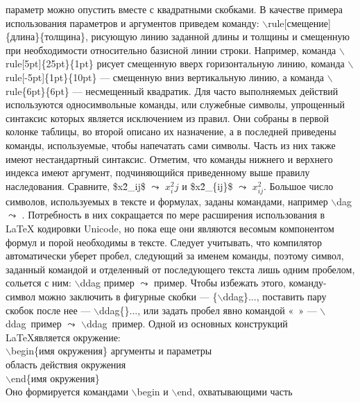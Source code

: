 \documentclass[a4paper, 14pt]{extarticle}
\begin{document}
	параметр можно опустить вместе с квадратными скобками.
	В качестве примера использования параметров и аргументов приведем команду:
	$\backslash$rule[смещение]\{длина\}\{толщина\},
	рисующую линию заданной длины и толщины и смещенную при
	необходимости относительно базисной линии строки. Например, команда $\backslash$rule[5pt]\{25pt\}\{1pt\} рисует смещенную вверх горизонтальную линию, команда $\backslash$rule[-5pt]\{1pt\}\{10pt\} — смещенную вниз вертикальную линию, а команда $\backslash$rule\{6pt\}\{6pt\} — несмещенный квадратик.
	Для часто выполняемых действий используются односимвольные
	команды, или служебные символы, упрощенный синтаксис которых является исключением из правил. Они собраны в первой колонке таблицы,
	во второй описано их назначение, а в последней приведены команды,
	используемые, чтобы напечатать сами символы. Часть из них также
	имеют нестандартный синтаксис.
	Отметим, что команды нижнего и верхнего индекса имеют аргумент,
	подчиняющийся приведенному выше правилу наследования. Сравните,
	\$x\^2\_ij\$ $\leadsto$ $x^2_ij$ и \$x\^2\_\{ij\}\$ $\leadsto$ $x^2_{ij}$.
	Большое число символов, используемых в тексте и формулах, заданы командами, например $\backslash$dag $\leadsto$ \dag. Потребность в них сокращается по
	мере расширения использования в \LaTeX{} кодировки Unicode, но пока еще
	они являются весомым компонентом формул и порой необходимы в тексте. Следует учитывать, что компилятор автоматически уберет пробел,
	следующий за именем команды, поэтому символ, заданный командой и
	отделенный от последующего текста лишь одним пробелом, сольется с
	ним: $\backslash$ddag пример $\leadsto$ \ddag пример. Чтобы избежать этого, команду-символ
	можно заключить в фигурные скобки — \{$\backslash$ddag\}..., поставить пару
	скобок после нее — $\backslash$ddag\{\}..., или задать пробел явно командой
	«\ » — $\backslash$ddag\ пример $\leadsto$ $\backslash$ddag\ пример.
	Одной из основных конструкций \LaTeX является окружение:\\
		$\backslash$begin\{имя окружения\} аргументы и параметры\\
			область действия окружения\\
		$\backslash$end\{имя окружения\}\\
	Оно формируется командами $\backslash$begin и $\backslash$end, охватывающими часть
\end{document}
